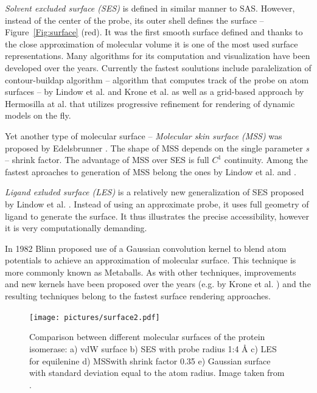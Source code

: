 \textit{Solvent excluded surface (SES)} \cite{richards1977areas} is defined in similar manner to SAS. However, instead of the center of the probe, its outer shell defines the surface -- Figure~\ref{Fig:surface} (red). It was the first smooth surface defined and thanks to the close approximation of molecular volume it is one of the most used surface representations. Many algorithms for its computation and visualization have been developed over the years. Currently the fastest soulutions include paralelization of contour-buildap algorithm \cite{totrov1996contour} -- algorithm that computes track of the probe on atom surfaces -- by Lindow et al. \cite{lindow2010accelerated} and Krone et al. \cite{6094043} as well as a grid-based approach by Hermosilla at al. \cite{hermosilla2017interactive} that utilizes progressive refinement for rendering of dynamic models on the fly.

Yet another type of molecular surface -- \textit{Molecular skin surface (MSS)} was proposed by Edelsbrunner \cite{edelsbrunner1999deformable}. The shape of MSS depends on the single parameter \textit{s} -- shrink factor. The advantage of MSS over SES is full $C^1$ continuity.  Among the fastest aproaches to generation of MSS belong the ones by Lindow et al. \cite{lindow2010accelerated} and \cite{Yan2017}.

\textit{Ligand exluded surface (LES)} is a relatively new generalization of SES proposed by Lindow et al. \cite{lindow2014ligand}. Instead of using an approximate probe, it uses full geometry of ligand to generate the surface. It thus illustrates the precise accessibility, however it is very computationally demanding.

In 1982 Blinn \cite{blinn1982generalization} proposed use of a Gaussian convolution
kernel to blend atom potentials to achieve an approximation of molecular surface. This technique is more commonly known as Metaballs. As with other techniques, improvements and new kernels have been proposed over the years (e.g. by Krone et al. \cite{krone2012fast}) and the resulting techniques belong to the fastest surface rendering approaches.

\begin{figure}[H]
  \centering
  \texttt{[image: pictures/surface2.pdf]} 
  \caption{Comparison between different molecular surfaces of the protein isomerase: a) vdW surface b) SES with probe radius 1:4 Å c) LES for equilenine d) MSSwith shrink factor 0.35 e) Gaussian surface with standard deviation equal to the atom radius. Image taken from \cite{kozlikova2015visualization}.}
  \label{Fig:surface2}  
\end{figure} 

